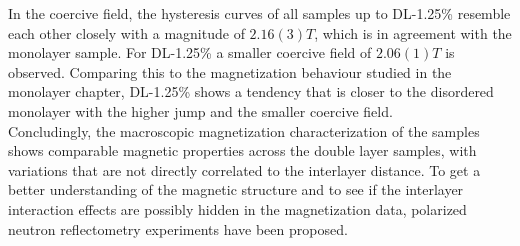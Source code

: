 \documentclass[\main/dresen_thesis.tex]{subfiles}
\begin{document}
    In the coercive field, the hysteresis curves of all samples up to DL-1.25\% resemble each other closely with a  magnitude of $2.16(3) \unit{T}$, which is in agreement with the monolayer sample.
    For DL-1.25\% a smaller coercive field of $2.06(1) \unit{T}$ is observed.
    Comparing this to the magnetization behaviour studied in the monolayer chapter, DL-1.25\% shows a tendency that is closer to the disordered monolayer with the higher jump and the smaller coercive field.
  \\

  Concludingly, the macroscopic magnetization characterization of the samples shows comparable magnetic properties across the double layer samples, with variations that are not directly correlated to the interlayer distance.
  To get a better understanding of the magnetic structure and to see if the interlayer interaction effects are possibly hidden in the magnetization data, polarized neutron reflectometry experiments have been proposed.


\end{document}
